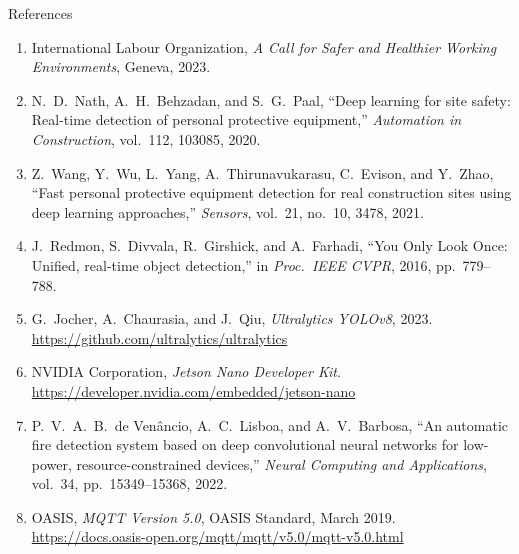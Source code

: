 \documentclass[aspectratio=169,10pt]{beamer}
\begin{document}
\begin{frame}{References}
  \scriptsize
  \begin{enumerate}
    \item[{[1]}] International Labour Organization, \emph{A Call for Safer and Healthier Working Environments}, Geneva, 2023.
    \item[{[2]}] N.\ D.\ Nath, A.\ H.\ Behzadan, and S.\ G.\ Paal, ``Deep learning for site safety: Real-time detection of personal protective equipment,'' \emph{Automation in Construction}, vol.\ 112, 103085, 2020.
    \item[{[3]}] Z.\ Wang, Y.\ Wu, L.\ Yang, A.\ Thirunavukarasu, C.\ Evison, and Y.\ Zhao, ``Fast personal protective equipment detection for real construction sites using deep learning approaches,'' \emph{Sensors}, vol.\ 21, no.\ 10, 3478, 2021.
    \item[{[4]}] J.\ Redmon, S.\ Divvala, R.\ Girshick, and A.\ Farhadi, ``You Only Look Once: Unified, real-time object detection,'' in \emph{Proc.\ IEEE CVPR}, 2016, pp.\ 779--788.
    \item[{[5]}] G.\ Jocher, A.\ Chaurasia, and J.\ Qiu, \emph{Ultralytics YOLOv8}, 2023. \url{https://github.com/ultralytics/ultralytics}
    \item[{[6]}] NVIDIA Corporation, \emph{Jetson Nano Developer Kit}. \url{https://developer.nvidia.com/embedded/jetson-nano}
    \item[{[7]}] P.\ V.\ A.\ B.\ de Ven\^ancio, A.\ C.\ Lisboa, and A.\ V.\ Barbosa, ``An automatic fire detection system based on deep convolutional neural networks for low-power, resource-constrained devices,'' \emph{Neural Computing and Applications}, vol.\ 34, pp.\ 15349--15368, 2022.
    \item[{[8]}] OASIS, \emph{MQTT Version 5.0}, OASIS Standard, March 2019. \url{https://docs.oasis-open.org/mqtt/mqtt/v5.0/mqtt-v5.0.html}
  \end{enumerate}
\end{frame}
\end{document}
